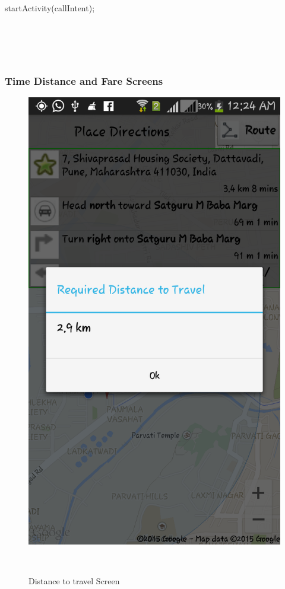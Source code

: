 \documentclass[12pt,a4paper]{article}
\begin{document}
{{{		startActivity(callIntent);\\
	}\\

}\\
\\

\newpage
\\
\subsubsection{Time Distance and Fare Screens}
\begin{figure}[!htb]
\centering
\includegraphics[width=12 cm]{distance}
\caption{Distance to travel Screen}
\\

\end{figure}}
\end{document}

